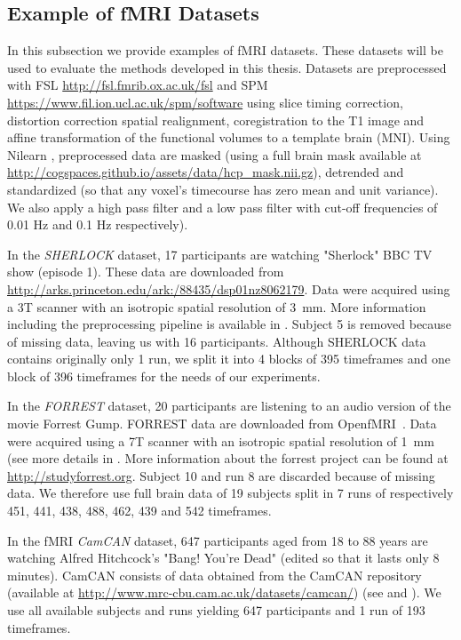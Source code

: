 \subsection{Example of fMRI Datasets}
\label{srm:datasets:fmri}
In this subsection we provide examples of fMRI datasets. These datasets will be used to evaluate the methods developed in this thesis.
Datasets are preprocessed with FSL \url{http://fsl.fmrib.ox.ac.uk/fsl}  and SPM \url{https://www.fil.ion.ucl.ac.uk/spm/software} using slice timing correction, distortion correction spatial realignment, coregistration to the T1 image and affine transformation of the functional volumes to a template brain (MNI).
Using Nilearn \cite{abraham2014machine}, preprocessed data are masked (using a full brain mask available at
\url{http://cogspaces.github.io/assets/data/hcp_mask.nii.gz}), detrended and
standardized (so that any voxel's timecourse has zero mean and unit variance).
We also apply a high pass filter and a low pass filter with cut-off frequencies of 0.01 Hz and 0.1 Hz respectively).

In the \emph{SHERLOCK} dataset, 17 participants are watching "Sherlock" BBC TV show (episode 1). 
% 
These data are downloaded from \url{http://arks.princeton.edu/ark:/88435/dsp01nz8062179}. 
% 
Data were acquired using a 3T scanner with an isotropic spatial resolution of 3~mm. 
% 
More information including the preprocessing pipeline is available in \cite{sherlock}.
% 
Subject 5 is removed because of missing data, leaving us with 16 participants.
% 
Although SHERLOCK data contains originally only 1 run, we split it into 4 blocks of 395 timeframes and one block of 396 timeframes for the needs of our experiments. 

In the \emph{FORREST} dataset, 20 participants are listening to an audio version of the movie Forrest Gump.
% 
FORREST data are downloaded from OpenfMRI~\cite{poldrack2013toward}. 
% 
Data were acquired using a 7T scanner with an isotropic spatial resolution of 1 mm (see more details in \cite{hanke2014high}.
% 
More information about the forrest project can be found at \url{http://studyforrest.org}.
% 
Subject 10 and run 8 are discarded because of missing data.
% 
We therefore use full brain data of 19 subjects split in 7 runs of respectively 451, 441, 438, 488, 462, 439 and 542 timeframes.


In the fMRI \emph{CamCAN} dataset, 647 participants aged from 18 to 88 years are watching Alfred Hitchcock's "Bang! You're Dead" (edited so that it lasts only 8 minutes).
% 
CamCAN consists of data obtained from the CamCAN repository (available at \url{http://www.mrc-cbu.cam.ac.uk/datasets/camcan/}) (see \cite{taylor2017cambridge} and \cite{shafto2014cambridge}).
% 
We use all available subjects and runs yielding 647 participants and 1 run of 193 timeframes.


